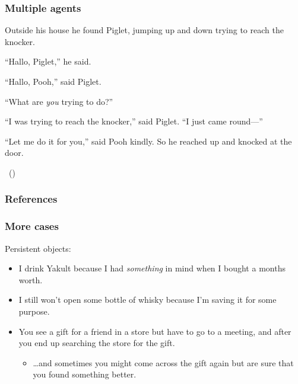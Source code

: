 \documentclass[noamssymb, compress, handout]{beamer} %
\begin{document}
\begin{frame}
  \frametitle{Multiple agents}

    {\rmfamily
    Outside his house he found Piglet, jumping up and down trying to reach the knocker.

    ``Hallo, Piglet,'' he said.

    ``Hallo, Pooh,'' said Piglet.

    ``What are \emph{you} trying to do?''

    ``I was trying to reach the knocker,'' said Piglet. ``I just came round---''

    ``Let me do it for you,'' said Pooh kindly.
    So he reached up and knocked at the door.}\linebreak
    \mbox{ }\hfill\mbox{(\cite[77--78]{Milne:2009aa})}
\end{frame}


\appendix

\begin{frame}[noframenumbering]
  \frametitle{References}
  \printbibliography
\end{frame}

\begin{frame}
  \frametitle{More cases}

  Persistent objects:
\begin{itemize}
\item I drink Yakult because I had \emph{something} in mind when I bought a months worth.
\item I still won't open some bottle of whisky because I'm saving it for some purpose.
\item You see a gift for a friend in a store but have to go to a meeting, and after you end up searching the store for the gift.
  \begin{itemize}
  \item \dots and sometimes you might come across the gift again but are sure that you found something better.
  \end{itemize}
\end{itemize}
\end{frame}
\end{document}
